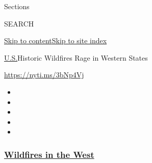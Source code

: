 Sections

SEARCH

\protect\hyperlink{site-content}{Skip to
content}\protect\hyperlink{site-index}{Skip to site index}

\href{/section/us}{U.S.}\textbar{}Historic Wildfires Rage in Western
States

\url{https://nyti.ms/3bNp4Vj}

\begin{itemize}
\item
\item
\item
\item
\item
\end{itemize}

\hypertarget{wildfires-in-the-west}{%
\subsubsection{\texorpdfstring{\href{https://www.nytimes3xbfgragh.onion/spotlight/california-wildfires?name=styln-california-wildfires\&region=TOP_BANNER\&block=storyline_menu_recirc\&action=click\&pgtype=Article\&impression_id=f9db9e60-f52b-11ea-ae97-1973f9761e7a\&variant=undefined}{Wildfires
in the West}}{Wildfires in the West}}\label{wildfires-in-the-west}}

